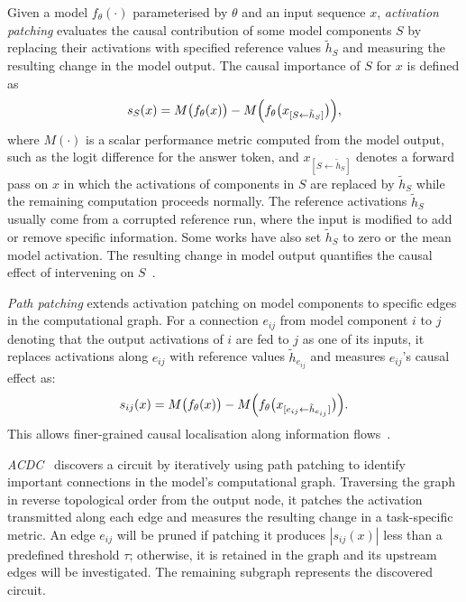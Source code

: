 \begin{definitionbox}
\label{def:attribution-patching}
Given a model $f_\theta(\cdot)$ parameterised by $\theta$ and an input sequence $x$, \emph{activation patching} evaluates the causal contribution of some model components $S$ by replacing their activations with specified reference values $\tilde{h}_S$ and measuring the resulting change in the model output. The causal importance of $S$ for $x$ is defined as
\[
s_S(x)
=
M\bigl(f_\theta(x)\bigr)
-
M\Bigl(f_\theta\bigl(x_{[S \leftarrow \tilde{h}_S]}\bigr)\Bigr),
\]
where \(M(\cdot)\) is a scalar performance metric computed from the model output, such as the logit difference for the answer token, and $x_{[S \leftarrow \tilde{h}_S]}$ denotes a forward pass on $x$ in which the activations of components in $S$ are replaced by $\tilde{h}_S$ while the remaining computation proceeds normally. The reference activations $\tilde{h}_S$ usually come from a corrupted reference run, where the input is modified to add or remove specific information. Some works have also set $\tilde{h}_S$ to zero or the mean model activation. The resulting change in model output quantifies the causal effect of intervening on $S$~.
\end{definitionbox}

\begin{definitionbox}
\label{def:path-patching}
\emph{Path patching} extends activation patching on model components to specific edges in the computational graph. For a connection \(e_{ij}\) from model component \(i\) to \(j\) denoting that the output activations of \(i\) are fed to \(j\) as one of its inputs, it replaces activations along \(e_{ij}\) with reference values \(\tilde{h}_{e_{ij}}\) and measures \(e_{ij}\)'s causal effect as:
\[
s_{ij}(x) = M\bigl(f_\theta(x)\bigr) - M\Bigl(f_\theta\bigl(x_{[e_{ij} \leftarrow \tilde{h}_{e_{ij}}]}\bigr)\Bigr).
\]
This allows finer-grained causal localisation along information flows~.
\end{definitionbox}

\begin{definitionbox}
\label{def:acdc}
\emph{ACDC}~ discovers a circuit by iteratively using path patching to identify important connections in the model’s computational graph. Traversing the graph in reverse topological order from the output node, it patches the activation transmitted along each edge and measures the resulting change in a task-specific metric. An edge $e_{ij}$ will be pruned if patching it produces $|s_{ij}(x)|$ less than a predefined threshold $\tau$; otherwise, it is retained in the graph and its upstream edges will be investigated. The remaining subgraph represents the discovered circuit.
\end{definitionbox}

